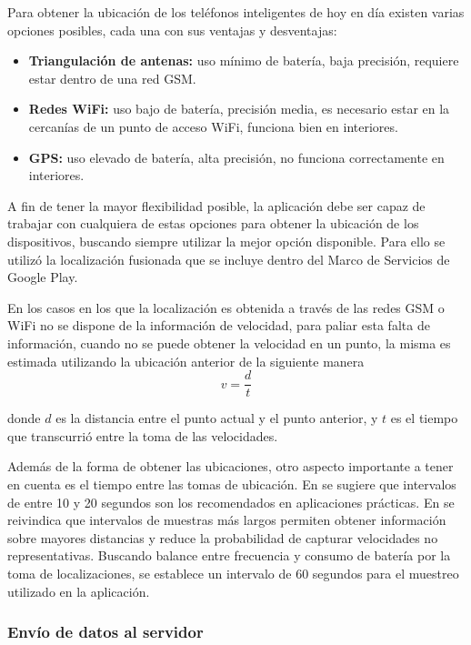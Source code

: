 Para obtener la ubicación de los teléfonos inteligentes de hoy en día existen varias opciones posibles, cada una con sus ventajas y desventajas: 
\begin{itemize}
\item \textbf{Triangulación de antenas:} uso mínimo de batería, baja precisión, requiere estar dentro de una red GSM.
\item \textbf{Redes WiFi:} uso bajo de batería, precisión media, es necesario estar en la cercanías de un punto de acceso WiFi, funciona bien en interiores.
\item \textbf{GPS:} uso elevado de batería, alta precisión, no funciona correctamente en interiores.
\end{itemize}
A fin de tener la mayor flexibilidad posible, la aplicación debe ser capaz de trabajar con cualquiera de estas opciones para obtener la ubicación de los dispositivos, buscando siempre utilizar la mejor opción disponible. Para ello se utilizó la localización fusionada que se incluye dentro del Marco de Servicios de Google Play.

En los casos en los que la localización es obtenida a través de las redes GSM o WiFi no se dispone de la información de velocidad, para paliar esta falta de información, cuando no se puede obtener la velocidad en un punto, la misma es estimada utilizando la ubicación anterior de la siguiente manera
\begin{equation}
v=\frac { d }{ t }
\end{equation}

donde $d$ es la distancia entre el punto actual y el punto anterior, y $t$ es el tiempo que transcurrió entre la toma de las velocidades.

Además de la forma de obtener las ubicaciones, otro aspecto importante a tener en cuenta es el tiempo entre las tomas de ubicación. En \cite{tao2012real} se sugiere que intervalos de entre 10 y 20 segundos son los recomendados en aplicaciones prácticas. En \cite{fontaine2005part} se reivindica que intervalos de muestras más largos permiten obtener información sobre mayores distancias y reduce la probabilidad de capturar velocidades no representativas. Buscando balance entre frecuencia y consumo de batería por la toma de localizaciones, se establece un intervalo de 60 segundos para el muestreo utilizado en la aplicación.

\subsubsection{Envío de datos al servidor}

